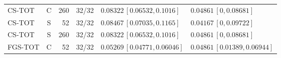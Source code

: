 \documentclass[10pt,a4paper]{article}
\begin{document}
\begin{longtable}{lcrcp{44mm}p{44mm}}
CS-TOT & C & 260 & 32/32 & \(0.08322\,[0.06532,0.1016]\) & \(0.04861\,[0,0.08681]\)\\
CS-TOT & S & 52 & 32/32 & \(0.08467\,[0.07035,0.1165]\) & \(0.04167\,[0,0.09722]\)\\
CS-TOT & S & 260 & 32/32 & \(0.08322\,[0.06532,0.1016]\) & \(0.04861\,[0,0.08681]\)\\
FGS-TOT & C & 52 & 32/32 & \(0.05269\,[0.04771,0.06046]\) & \(0.04861\,[0.01389,0.06944]\)\\

\end{longtable}
\end{document}
